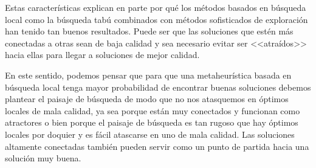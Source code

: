 Estas características explican en parte por qué los métodos basados en búsqueda local como la búsqueda tabú combinados con métodos sofisticados de exploración han tenido tan buenos resultados. Puede ser que las soluciones que estén más conectadas a otras sean de baja calidad y sea necesario evitar ser <<atraídos>> hacia ellas para llegar a soluciones de mejor calidad.

En este sentido, podemos pensar que para que una metaheurística basada en búsqueda local tenga mayor probabilidad de encontrar buenas soluciones debemos plantear el paisaje de búsqueda de modo que no nos atasquemos en óptimos locales de mala calidad, ya sea porque están muy conectados y funcionan como atractores o bien porque el paisaje de búsqueda es tan rugoso que hay óptimos locales por doquier y es fácil atascarse en uno de mala calidad. Las soluciones altamente conectadas también pueden servir como un punto de partida hacia una solución muy buena.

